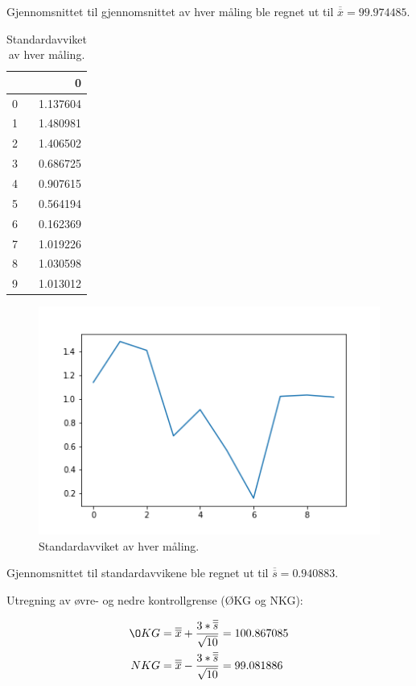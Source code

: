 \documentclass[12pt]{article}
\begin{document}
Gjennomsnittet til gjennomsnittet av hver måling ble regnet ut til  $\overline{\overline{x}}=99.974485$.



\begin{table}[H]
    \centering
    \caption{Standardavviket av hver måling.}
\begin{tabular}{lr}
\toprule
{} &         0 \\
\midrule
0 &  1.137604 \\
1 &  1.480981 \\
2 &  1.406502 \\
3 &  0.686725 \\
4 &  0.907615 \\
5 &  0.564194 \\
6 &  0.162369 \\
7 &  1.019226 \\
8 &  1.030598 \\
9 &  1.013012 \\
\bottomrule
\end{tabular}
    \label{tab:tab7}
\end{table}



\begin{figure}[H]
    \centering
    \includegraphics[scale = 1]{avvik1.png}
    \caption{Standardavviket av hver måling.}
    \label{fig:fig11}
\end{figure}
Gjennomsnittet til standardavvikene ble regnet ut til $\overline{\overline{s}}=0.940883$.

Utregning av øvre- og nedre kontrollgrense (ØKG og NKG)\cite{1}:

\begin{equation}
\centering
\begin{aligned}
ØKG & = {\overline{\overline{x}}+\frac{3*\overline{\overline{s}}}{\sqrt{10}}}=100.867085\\
NKG & = {\overline{\overline{x}}-\frac{3*\overline{\overline{s}}}{\sqrt{10}}}=99.081886  
\end{aligned}
\end{equation}
\end{document}
